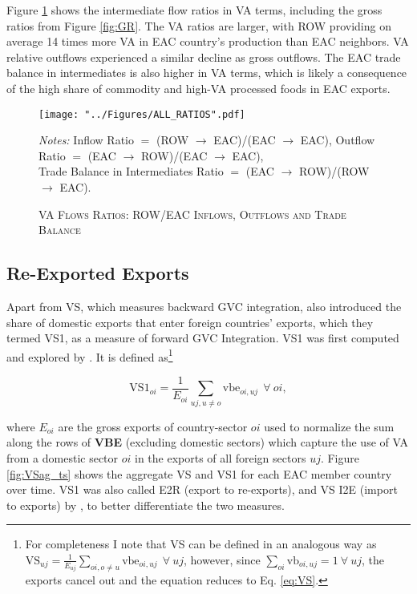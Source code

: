 \documentclass[a4paper]{article}
\begin{document}
Figure \ref{fig:TBint} shows the intermediate flow ratios in VA terms, including the gross ratios from Figure \ref{fig:GR}. The VA ratios are larger, with ROW providing on average 14 times more VA in EAC country's production than EAC neighbors. VA relative outflows experienced a similar decline as gross outflows. The EAC trade balance in intermediates is also higher in VA terms, which is likely a consequence of the high share of commodity and high-VA processed foods in EAC exports. 

\begin{figure}[h!]
\centering
\caption{\label{fig:TBint}\textsc{VA Flows Ratios: ROW/EAC Inflows, Outflows and Trade Balance}}
\texttt{[image: "../Figures/ALL\_RATIOS".pdf]} %
\raggedright
\scriptsize
\emph{Notes:} Inflow Ratio $=$ (ROW $\to$ EAC)/(EAC $\to$ EAC), Outflow Ratio $=$ (EAC $\to$ ROW)/(EAC $\to$ EAC),\\ \hphantom{Notes:.} Trade Balance in Intermediates Ratio $=$ (EAC $\to$ ROW)/(ROW $\to$ EAC). 
\end{figure}


\subsection{Re-Exported Exports}

Apart from VS, which measures backward GVC integration, \citet{hummels2001nature} also introduced the share of domestic exports that enter foreign countries' exports, which they termed VS1, as a measure of forward GVC Integration. VS1 was first computed and explored by \citet{daudin2011produces}. It is defined as\footnote{For completeness I note that VS can be defined in an analogous way as $\text{VS}_{uj} = \frac{1}{E_{uj}} \sum_{oi, o \neq  u} \text{vbe}_{oi, uj}\ \ \forall\ uj$, however, since $\sum_{oi} \text{vb}_{oi, uj} = 1\ \forall\ uj$, the exports cancel out and the equation reduces to Eq. \ref{eq:VS}.} 

\begin{equation} \label{eq:VS1}
\text{VS1}_{oi} = \frac{1}{E_{oi}} \sum_{uj, u \neq  o} \text{vbe}_{oi, uj}\ \ \forall\ oi,
\end{equation}

where $E_{oi}$ are the gross exports of country-sector $oi$ used to normalize the sum along the rows of \textbf{VBE} (excluding domestic sectors) which capture the use of VA from a domestic sector $oi$ in the exports of all foreign sectors $uj$. Figure \ref{fig:VSag_ts} shows the aggregate VS and VS1 for each EAC member country over time. VS1 was also called E2R (export to re-exports), and VS I2E (import to exports) by \citet{baldwin2015supply}, to better differentiate the two measures. \newline 
\end{document}
